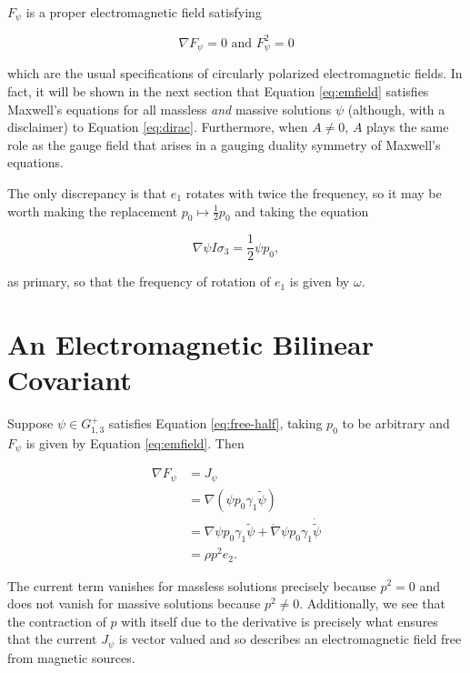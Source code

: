 \documentclass{article}
\begin{document}
    $F_\psi$ is a proper electromagnetic field satisfying

    \begin{equation}
      \nabla F_\psi = 0 \text { and } F_\psi^2 = 0
    \end{equation}

    which are the usual specifications of circularly polarized electromagnetic fields. In fact, it will be shown in the next section that Equation \ref{eq:emfield} satisfies Maxwell's equations for all massless \emph{and} massive solutions $\psi$ (although, with a disclaimer) to Equation \ref{eq:dirac}. Furthermore, when $A \not= 0$, $A$ plays the same role as the gauge field that arises in a gauging duality symmetry of Maxwell's equations.

    The only discrepancy is that $e_1$ rotates with twice the frequency, so it may be worth making the replacement $p_0 \mapsto \frac{1}{2} p_0$ and taking the equation

    \begin{equation}
      \nabla \psi I \sigma_3 = \frac{1}{2} \psi p_0,\label{eq:free-half}
    \end{equation}

    as primary, so that the frequency of rotation of $e_1$ is given by $\omega$.

    \section{An Electromagnetic Bilinear Covariant}\label{electromagnetism}

    Suppose $\psi \in G_{1,3}^+$ satisfies Equation \ref{eq:free-half}, taking $p_0$ to be arbitrary and $F_\psi$ is given by Equation \ref{eq:emfield}. Then

    \begin{align}
      \nabla F_\psi &= J_\psi\\
      &= \nabla (\psi p_0 \gamma_1 \widetilde \psi)\\
      &= \nabla \psi p_0 \gamma_1 \widetilde \psi + \dot \nabla \psi p_0 \gamma_1 \dot{\widetilde \psi} \\
      &= \rho p^2 e_2.
    \end{align}

    The current term vanishes for massless solutions precisely because $p^2 = 0$ and does not vanish for massive solutions because $p^2 \not= 0$. Additionally, we see that the contraction of $p$ with itself due to the derivative is precisely what ensures that the current $J_\psi$ is vector valued and so describes an electromagnetic field free from magnetic sources.
\end{document}
